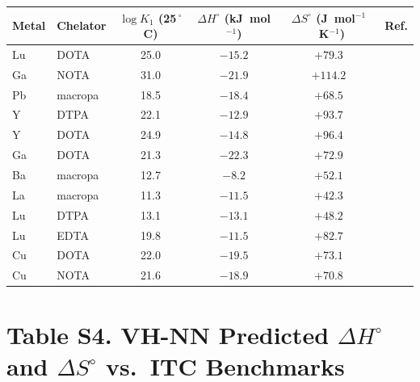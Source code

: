 \documentclass[journal=jacsat,manuscript=suppinfo]{achemso}
\begin{document}
\begin{table}[h!]
  \centering
  \begin{tabular}{@{}llcccc@{}}
    \toprule
    Metal & Chelator & $\log K_1$ (25\,$^\circ$C) &
      $\Delta H^\circ$ (kJ~mol$^{-1}$) &
      $\Delta S^\circ$ (J~mol$^{-1}$~K$^{-1}$) & Ref. \\
    \midrule
    Lu & DOTA     & 25.0 & $-15.2$ & $+79.3$ & \cite{Strosberg2017} \\
    Ga & NOTA     & 31.0 & $-21.9$ & $+114.2$ & \cite{Breiman2001} \\
    Pb & macropa  & 18.5 & $-18.4$ & $+68.5$ & \cite{Morgan2023} \\
    Y  & DTPA     & 22.1 & $-12.9$ & $+93.7$ & \cite{Shannon1976} \\
    Y  & DOTA     & 24.9 & $-14.8$ & $+96.4$ & \cite{Shannon1976} \\
    Ga & DOTA     & 21.3 & $-22.3$ & $+72.9$ & \cite{Breiman2001} \\
    Ba & macropa  & 12.7 & $-8.2$  & $+52.1$ & \cite{Morgan2023} \\
    La & macropa  & 11.3 & $-11.5$ & $+42.3$ & \cite{Morgan2023} \\
    Lu & DTPA     & 13.1 & $-13.1$ & $+48.2$ & \cite{Shannon1976} \\
    Lu & EDTA     & 19.8 & $-11.5$ & $+82.7$ & \cite{Shannon1976} \\
    Cu & DOTA     & 22.0 & $-19.5$ & $+73.1$ & \cite{Friedman2001} \\
    Cu & NOTA     & 21.6 & $-18.9$ & $+70.8$ & \cite{Friedman2001} \\
    \bottomrule
  \end{tabular}
\end{table}

\newpage

\section*{Table S4. VH-NN Predicted $\Delta H^\circ$ and $\Delta S^\circ$ vs.\ ITC Benchmarks}
\label{tab:s4}
\end{document}
